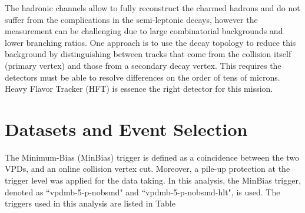 \documentclass[a4paper]{article}
\begin{document}
The hadronic channels allow to fully reconstruct the charmed hadrons and do not suffer from the complications in the semi-leptonic decays, however the measurement can be challenging due to large combinatorial backgrounds and lower branching ratios. One approach is to use the decay topology to reduce this background by distinguishing between tracks that come from the collision itself (primary vertex) and those from a secondary decay vertex. This requires the detectors must be able to resolve differences on the order of tens of microns. Heavy Flavor Tracker (HFT) is essence the right detector for this mission.

\section{\label{dataset}Datasets and Event Selection}


The Minimum-Bias (MinBias) trigger is defined as a coincidence between the two VPDs, and an online collision vertex cut. Moreover, a pile-up protection at the trigger level was applied for the data taking. In this analysis, the MinBias trigger, denoted as ``vpdmb-5-p-nobsmd" and ``vpdmb-5-p-nobsmd-hlt", is used. The triggers used in this analysis are listed in Table %

\end{document}
